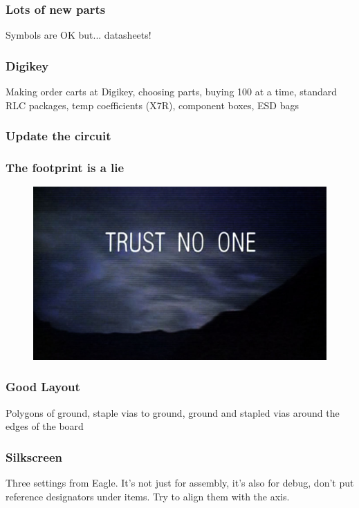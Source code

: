 \documentclass{beamer}
\begin{document}

\begin{frame}
\frametitle{Lots of new parts}
Symbols are OK but... datasheets!
\end{frame}


\begin{frame}
\frametitle{Digikey}
Making order carts at Digikey, choosing parts, buying 100 at a time, standard RLC packages, temp coefficients (X7R), component boxes, ESD bags
\end{frame}


\begin{frame}
\frametitle{Update the circuit}
\end{frame}


\begin{frame}
\frametitle{The footprint is a lie}
\begin{figure}
\includegraphics[width=0.8\linewidth]{trustnoone.jpg}
\end{figure}
\end{frame}


\begin{frame}
\frametitle{Good Layout}
Polygons of ground, staple vias to ground, ground and stapled vias around the edges of the board
\end{frame}


\begin{frame}
\frametitle{Silkscreen}
Three settings from Eagle. It's not just for assembly, it's also for debug, don't put reference designators under items. Try to align them with the axis.
\end{frame}
\end{document}
